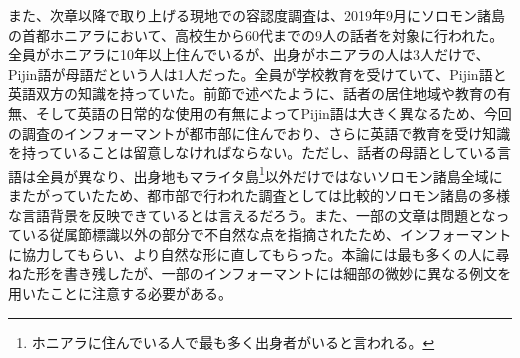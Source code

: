 また、次章以降で取り上げる現地での容認度調査は、2019年9月にソロモン諸島の首都ホニアラにおいて、高校生から60代までの9人の話者を対象に行われた。全員がホニアラに10年以上住んでいるが、出身がホニアラの人は3人だけで、Pijin語が母語だという人は1人だった。全員が学校教育を受けていて、Pijin語と英語双方の知識を持っていた。前節で述べたように、話者の居住地域や教育の有無、そして英語の日常的な使用の有無によってPijin語は大きく異なるため、今回の調査のインフォーマントが都市部に住んでおり、さらに英語で教育を受け知識を持っていることは留意しなければならない。ただし、話者の母語としている言語は全員が異なり、出身地もマライタ島\footnote{
ホニアラに住んでいる人で最も多く出身者がいると言われる。}以外だけではないソロモン諸島全域にまたがっていたため、都市部で行われた調査としては比較的ソロモン諸島の多様な言語背景を反映できているとは言えるだろう。また、一部の文章は問題となっている従属節標識以外の部分で不自然な点を指摘されたため、インフォーマントに協力してもらい、より自然な形に直してもらった。本論には最も多くの人に尋ねた形を書き残したが、一部のインフォーマントには細部の微妙に異なる例文を用いたことに注意する必要がある。
